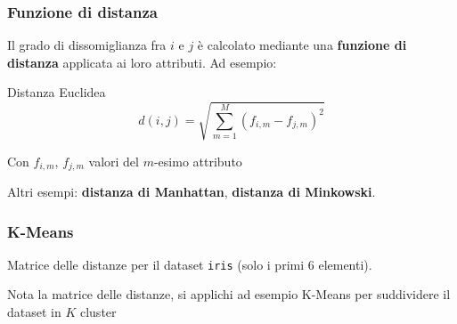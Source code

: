 \documentclass{beamer}
\begin{document}
        \begin{frame}
            \frametitle{Funzione di distanza}

            Il grado di dissomiglianza fra $i$ e $j$ è calcolato mediante
            una \textbf{funzione di distanza} applicata ai loro attributi.
            Ad esempio:

            \vfill

            \begin{block}{Distanza Euclidea}
                \begin{equation*}
                    d(i, j) = \sqrt{\sum_{m = 1}^{M} (f_{i, m} - f_{j, m})^{2}}
                \end{equation*}

            Con $f_{i, m}$, $f_{j, m}$ valori del $m$-esimo attributo
            \end{block}

            \vfill

            Altri esempi: \textbf{distanza di Manhattan},
            \textbf{distanza di Minkowski}.
        \end{frame}

        \begin{frame}
            \frametitle{K-Means}

            \begin{table}[h]
            \centering
                \caption{Matrice delle distanze per il dataset \texttt{iris} (solo i primi 6 elementi).}
                \label{tab:dist}
            \end{table}

            \vfill

            Nota la matrice delle distanze, si applichi ad esempio K-Means
            per suddividere il dataset in $K$ cluster
        \end{frame}


\end{document}
